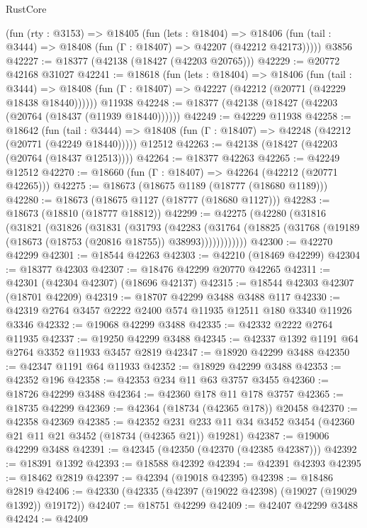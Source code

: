 \begin{lexlean}{RustCore}
\begin{coremodule}
    (fun (rty : @3153) =>
    @18405
      (fun (lets : @18404) =>
      @18406 (fun (tail : @3444) => @18408 (fun (Γ : @18407) => @42207 (@42212 @42173)))))
    @3856
@42227 := @18377 (@42138 (@18427 (@42203 @20765)))
@42229 := @20772 @42168 @31027
@42241 := @18618
    (fun (lets : @18404) =>
    @18406
      (fun (tail : @3444) =>
      @18408 (fun (Γ : @18407) => @42227 (@42212 (@20771 (@42229 @18438 @18440))))))
    @11938
@42248 := @18377 (@42138 (@18427 (@42203 (@20764 (@18437 (@11939 @18440))))))
@42249 := @42229 @11938
@42258 := @18642
    (fun (tail : @3444) => @18408 (fun (Γ : @18407) => @42248 (@42212 (@20771 (@42249 @18440)))))
    @12512
@42263 := @42138 (@18427 (@42203 (@20764 (@18437 @12513))))
@42264 := @18377 @42263
@42265 := @42249 @12512
@42270 := @18660 (fun (Γ : @18407) => @42264 (@42212 (@20771 @42265)))
@42275 := @18673 (@18675 @1189 (@18777 (@18680 @1189)))
@42280 := @18673 (@18675 @1127 (@18777 (@18680 @1127)))
@42283 := @18673 (@18810 (@18777 @18812))
@42299 := @42275
    (@42280
      (@31816
        (@31821
          (@31826
            (@31831
              (@31793
                (@42283
                  (@31764
                    (@18825 (@31768 (@19189 (@18673 (@18753 (@20816 @18755)) @38993))))))))))))
@42300 := @42270 @42299
@42301 := @18544 @42263
@42303 := @42210 (@18469 @42299)
@42304 := @18377 @42303
@42307 := @18476 @42299 @20770 @42265
@42311 := @42301 (@42304 @42307) (@18696 @42137)
@42315 := @18544 @42303 @42307 (@18701 @42209)
@42319 := @18707 @42299 @3488 @3488 @117
@42330 := @42319 @2764 @3457 @2222 @2400 @574 @11935 @12511 @180 @3340 @11926 @3346
@42332 := @19068 @42299 @3488
@42335 := @42332 @2222 @2764 @11935
@42337 := @19250 @42299 @3488
@42345 := @42337 @1392 @1191 @64 @2764 @3352 @11933 @3457 @2819
@42347 := @18920 @42299 @3488
@42350 := @42347 @1191 @64 @11933
@42352 := @18929 @42299 @3488
@42353 := @42352 @196
@42358 := @42353 @234 @11 @63 @3757 @3455
@42360 := @18726 @42299 @3488
@42364 := @42360 @178 @11 @178 @3757
@42365 := @18735 @42299
@42369 := @42364 (@18734 (@42365 @178)) @20458
@42370 := @42358 @42369
@42385 := @42352
    @231
    @233
    @11
    @34
    @3452
    @3454
    (@42360 @21 @11 @21 @3452 (@18734 (@42365 @21)) @19281)
@42387 := @19006 @42299 @3488
@42391 := @42345 (@42350 (@42370 (@42385 @42387)))
@42392 := @18391 @1392
@42393 := @18588 @42392
@42394 := @42391 @42393
@42395 := @18462 @2819
@42397 := @42394 (@19018 @42395)
@42398 := @18486 @2819
@42406 := @42330 (@42335 (@42397 (@19022 @42398) (@19027 (@19029 @1392)) @19172))
@42407 := @18751 @42299
@42409 := @42407 @42299 @3488
@42424 := @42409

\end{coremodule}
\end{lexlean}
